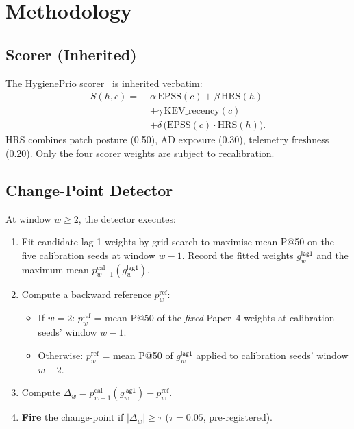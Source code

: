 \section{Methodology}

\subsection{Scorer (Inherited)}

The HygienePrio scorer~\cite{paper4hygieneprio} is inherited
verbatim:
\begin{equation}
\begin{aligned}
S(h,c) =\;& \alpha\,\mathrm{EPSS}(c) + \beta\,\mathrm{HRS}(h) \\
          & + \gamma\,\mathrm{KEV\_recency}(c) \\
          & + \delta\,\bigl(\mathrm{EPSS}(c) \cdot \mathrm{HRS}(h)\bigr).
\end{aligned}
\label{eq:hp}
\end{equation}
HRS combines patch posture (0.50), AD exposure (0.30), telemetry
freshness (0.20). Only the four scorer weights are subject to
recalibration.

\subsection{Change-Point Detector}

At window $w \geq 2$, the detector executes:

\begin{enumerate}
\item Fit candidate lag-1 weights by grid search to maximise mean
P@50 on the five calibration seeds at window $w - 1$. Record the
fitted weights $g^{\textsf{lag1}}_w$ and the maximum mean
$p^{\text{cal}}_{w-1}(g^{\textsf{lag1}}_w)$.
\item Compute a backward reference $p^{\text{ref}}_w$:
  \begin{itemize}
  \item If $w = 2$: $p^{\text{ref}}_w$ = mean P@50 of the
  \textit{fixed} Paper~4 weights at calibration seeds' window
  $w - 1$.
  \item Otherwise: $p^{\text{ref}}_w$ = mean P@50 of $g^{\textsf{lag1}}_w$
  applied to calibration seeds' window $w - 2$.
  \end{itemize}
\item Compute $\Delta_w = p^{\text{cal}}_{w-1}(g^{\textsf{lag1}}_w)
- p^{\text{ref}}_w$.
\item \textbf{Fire} the change-point if $|\Delta_w| \geq \tau$
($\tau = 0.05$, pre-registered).
\end{enumerate}

